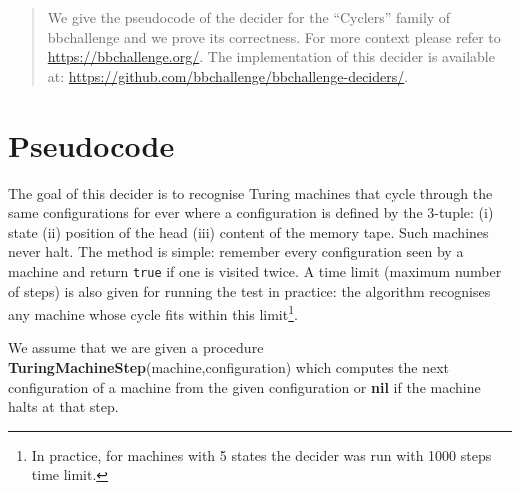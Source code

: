 \documentclass[a4paper,british]{article}
\begin{document}
\date{}
\maketitle

\begin{abstract}
        We give the pseudocode of the decider for the ``Cyclers'' family of bbchallenge and we prove its correctness. For more context please refer to \url{https://bbchallenge.org/}. The implementation of this decider is available at: \url{https://github.com/bbchallenge/bbchallenge-deciders/}.
\end{abstract}

\section{Pseudocode}

The goal of this decider is to recognise Turing machines that cycle through the same configurations for ever where a configuration is defined by the 3-tuple: (i) state (ii) position of the head (iii) content of the memory tape. Such machines never halt. The method is simple: remember every configuration seen by a machine and return \texttt{true} if one is visited twice. A time limit (maximum number of steps) is also given for running the test in practice: the algorithm recognises any machine whose cycle fits within this limit\footnote{In practice, for machines with 5 states the decider was run with 1000 steps time limit.}.

We assume that we are given a procedure \textbf{TuringMachineStep}(machine,configuration) which computes the next configuration of a machine from the given configuration or \textbf{nil} if the machine halts at that step.
\end{document}
